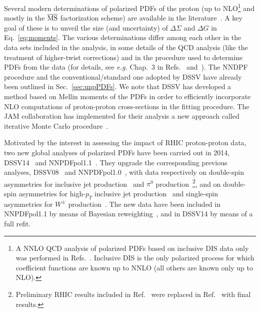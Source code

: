 Several modern determinations of polarized PDFs of the proton (up to 
NLO\footnote{A NNLO QCD analysis of polarized PDFs based on inclusive DIS
data only was performed in Refs.~\cite{Shahri:2016uzl,Khanpour:2017cha}.
Inclusive DIS is the only polarized process for which coefficient functions
are known up to NNLO (all others are known only up to NLO).} 
and mostly in the $\overline{\rm MS}$ factorization scheme) are available in 
the literature~\cite{Nocera:2014gqa,Nocera:2016xhb,deFlorian:2014yva,deFlorian:2008mr,deFlorian:2009vb,Sato:2016tuz,Leader:2010rb,Blumlein:2010rn,Bourrely:2014uha,Hirai:2008aj}. 
%
A key goal of these is to unveil the size (and uncertainty) of
$\Delta\Sigma$ and  $\Delta G$ in Eq.~\eqref{eq:moments}. 
%
The various determinations differ among each other in the data sets included 
in the analysis, in some details of the QCD analysis (like the treatment of 
higher-twist corrections) and in the procedure used to determine PDFs from the 
data (for details, see {\it e.g.} Chap.~3 in Refs.~\cite{Nocera:2014vla} 
and~\cite{Nocera:2016xhb,Jimenez-Delgado:2013sma}). 
%
The NNDPF procedure and the conventional/standard one adopted by DSSV have 
already been outlined in Sec.~\ref{sec:unpPDFs}. 
%
We note that DSSV has developed a method based on Mellin moments of the PDFs 
in order to efficiently incorporate NLO computations
of proton-proton cross-sections in the fitting procedure. 
%
The JAM collaboration has implemented for their analysis a new approach called 
iterative Monte Carlo procedure~\cite{Sato:2016tuz}. 

Motivated by the interest in assessing the impact of RHIC proton-proton 
data, two new global analyses of polarized PDFs have been carried out in
2014, DSSV14~\cite{deFlorian:2014yva} and NNPDFpol1.1~\cite{Nocera:2014gqa}.
%
They upgrade the corresponding previous analyses, 
DSSV08~\cite{deFlorian:2008mr,deFlorian:2009vb} and 
NNPDFpol1.0~\cite{Ball:2013lla}, with data respectively on double-spin 
asymmetries for inclusive jet production~\cite{Adamczyk:2014ozi} 
and $\pi^0$ production~\cite{Adare:2014hsq}\footnote{Preliminary RHIC results 
included in Ref.~\cite{deFlorian:2008mr} were replaced in
Ref.~\cite{deFlorian:2014yva} with final results.}, 
and on double-spin asymmetries for high-$p_T$ inclusive jet 
production~\cite{Adamczyk:2014ozi,Adamczyk:2012qj,Adare:2010cc} and single-spin
asymmetries for $W^\pm$ production~\cite{Adamczyk:2014xyw}.
%
The new data have been included in NNPDFpol1.1 
by means of Bayesian reweighting~\cite{Ball:2010gb},
and in DSSV14 by means of a full refit.  

